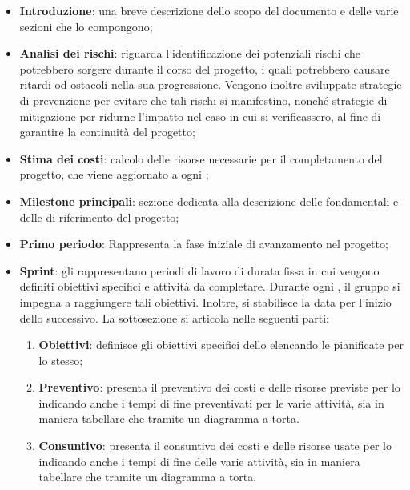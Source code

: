 \begin{itemize}
    \item \textbf{Introduzione}: una breve descrizione dello scopo del documento e delle varie sezioni che lo compongono;
    \item \textbf{Analisi dei rischi}: riguarda l'identificazione dei potenziali rischi che potrebbero sorgere durante il corso del progetto, i quali potrebbero causare ritardi od ostacoli nella sua progressione. Vengono inoltre sviluppate strategie di prevenzione per evitare che tali rischi si manifestino, nonché strategie di mitigazione per ridurne l'impatto nel caso in cui si verificassero, al fine di garantire la continuità del progetto;
    \item \textbf{Stima dei costi}: calcolo delle risorse necessarie per il completamento del progetto, che viene aggiornato a ogni ;
    \item \textbf{Milestone principali}: sezione dedicata alla descrizione delle  fondamentali e delle  di riferimento del progetto;
    \item \textbf{Primo periodo}: Rappresenta la fase iniziale di avanzamento nel progetto;
    \item \textbf{Sprint}: gli  rappresentano periodi di lavoro di durata fissa in cui vengono definiti obiettivi specifici e attività da completare. Durante ogni , il gruppo si impegna a raggiungere tali obiettivi. Inoltre, si stabilisce la data per l'inizio dello  successivo.
    La sottosezione si articola nelle seguenti parti:
    \begin{enumerate}

        \item \textbf{Obiettivi}: definisce gli obiettivi specifici dello  elencando le  pianificate per lo stesso;

        \item \textbf{Preventivo}: presenta il preventivo dei costi e delle risorse previste per lo  indicando anche i tempi di fine preventivati per le varie attività, sia in maniera tabellare che tramite un diagramma a torta.
        
        \item \textbf{Consuntivo}: presenta il consuntivo dei costi e delle risorse usate per lo  indicando anche i tempi di fine delle varie attività, sia in maniera tabellare che tramite un diagramma a torta.
        

\end{enumerate}
\end{itemize}

